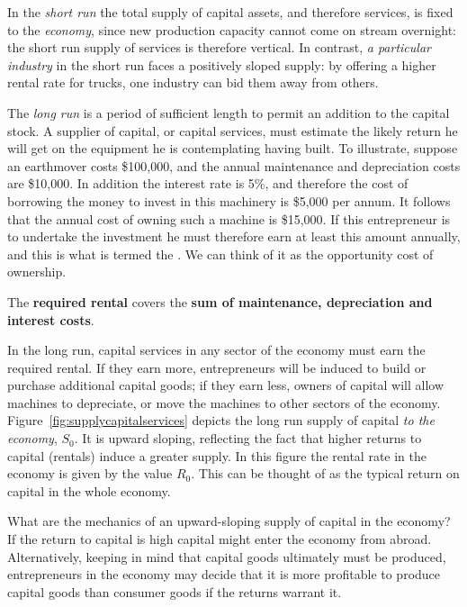 In the \textit{short run} the total supply of capital assets, and therefore services, is fixed to the \textit{economy}, since new production capacity cannot come on stream overnight: the short run supply of services is therefore vertical. In contrast, \textit{a particular industry} in the short run faces a positively sloped supply: by offering a higher rental rate for trucks, one industry can bid them away from others.

The \textit{long run} is a period of sufficient length to permit an addition to the capital stock. A supplier of capital, or capital services, must estimate the likely return he will get on the equipment he is contemplating having built. To illustrate, suppose an earthmover costs \$100,000, and the annual maintenance and depreciation costs are \$10,000. In addition the interest rate is 5\%, and therefore the cost of borrowing the money to invest in this machinery is \$5,000 per annum. It follows that the annual cost of owning such a machine is \$15,000. If this entrepreneur is to undertake the investment he must therefore earn at least this amount annually, and this is what is termed the . We can think of it as the opportunity cost of ownership.

\begin{DefBox}
The \textbf{required rental} covers the \textbf{sum of maintenance, depreciation and interest costs}.
\end{DefBox}

In the long run, capital services in any sector of the economy must earn the required rental. If they earn more, entrepreneurs will be induced to build or purchase additional capital goods; if they earn less, owners of capital will allow machines to depreciate, or move the machines to other sectors of the economy. Figure~\ref{fig:supplycapitalservices} depicts the long run supply of capital \textit{to the economy}, $S_0$. It is upward sloping, reflecting the fact that higher returns to capital (rentals) induce a greater supply. In this figure the rental rate in the economy is given by the value $R_0$. This can be thought of as the typical return on capital in the whole economy.



What are the mechanics of an upward-sloping supply of capital in the economy? If the return to capital is high capital might enter the economy from abroad. Alternatively, keeping in mind that capital goods ultimately must be produced, entrepreneurs in the economy may decide that it is more profitable to produce capital goods than consumer goods if the returns warrant it.

